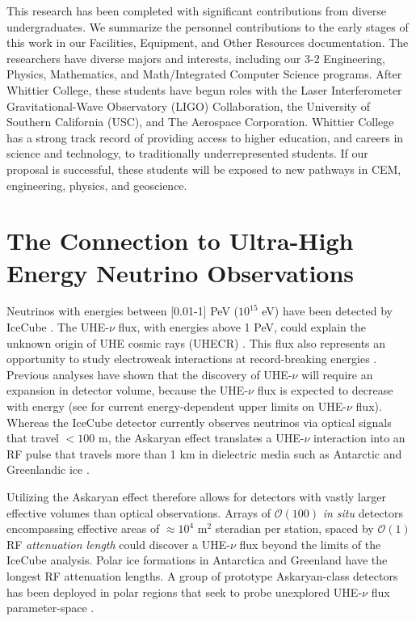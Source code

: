 \documentclass[11pt]{amsart}
\begin{document}
This research has been completed with significant contributions from diverse undergraduates.  We summarize the personnel contributions to the early stages of this work in our Facilities, Equipment, and Other Resources documentation.  The researchers have diverse majors and interests, including our 3-2 Engineering, Physics, Mathematics, and Math/Integrated Computer Science programs.   After Whittier College, these students have begun roles with the Laser Interferometer Gravitational-Wave Observatory (LIGO) Collaboration, the University of Southern California (USC), and The Aerospace Corporation.  Whittier College has a strong track record of providing access to higher education, and careers in science and technology, to traditionally underrepresented students.  If our proposal is successful, these students will be exposed to new pathways in CEM, engineering, physics, and geoscience.

\section{The Connection to Ultra-High Energy Neutrino Observations}
\label{sec:askaryan}

Neutrinos with energies between [0.01-1] PeV ($10^{15}$ eV) have been detected by IceCube \cite{10.1126/science.1242856,10.1126/science.aat2890,10.1126/science.abg3395,10.1126/science.adc9818}.  The UHE-$\nu$ flux, with energies above 1 PeV, could explain the unknown origin of UHE cosmic rays (UHECR) \cite{Ackermann:201946d}.  This flux also represents an opportunity to study electroweak interactions at record-breaking energies \cite{Ackermann:20195ec}.  Previous analyses have shown that the discovery of UHE-$\nu$ will require an expansion in detector volume, because the UHE-$\nu$ flux is expected to decrease with energy (see \cite{10.1103/physrevd.99.122001,10.1088/1475-7516/2020/03/053,10.1103/physrevd.98.062003} for current energy-dependent upper limits on UHE-$\nu$ flux).  Whereas the IceCube detector currently observes neutrinos via optical signals that travel $<100$ m, the Askaryan effect translates a UHE-$\nu$ interaction into an RF pulse that travels more than 1 km in dielectric media such as Antarctic and Greenlandic ice \cite{askaryan1,zhs,10.3189/2015jog14j214, 10.3189/2015jog15j057, 10.1016/j.astropartphys.2011.11.010}. 

Utilizing the Askaryan effect therefore allows for detectors with vastly larger effective volumes than optical observations.  Arrays of $\mathcal{O}(100)$ \textit{in situ} detectors encompassing effective areas of $\approx 10^4$ m$^2$ steradian per station, spaced by $\mathcal{O}(1)$ RF \textit{attenuation length} could discover a UHE-$\nu$ flux beyond the limits of the IceCube analysis.  Polar ice formations in Antarctica and Greenland have the longest RF attenuation lengths.  A group of prototype Askaryan-class detectors has been deployed in polar regions that seek to probe unexplored UHE-$\nu$ flux parameter-space \cite{rice,10.1088/1475-7516/2020/03/053,10.1103/physrevd.102.043021,10.1103/physrevd.99.122001}. 
\end{document}
